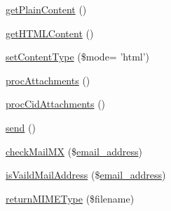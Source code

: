 \begin{DoxyCompactItemize}
\item 
\hyperlink{classMail_ac1a5a2b325a14e6331f13d2b2b18d9f8}{get\-Plain\-Content} ()
\item 
\hyperlink{classMail_a74db66148c78f2e732a3f2797b108eae}{get\-H\-T\-M\-L\-Content} ()
\item 
\hyperlink{classMail_adc8e047b6acd8b183bac7082180cb18f}{set\-Content\-Type} (\$mode= 'html')
\item 
\hyperlink{classMail_a136e94d3b4ae6cea8944cf05f58754ce}{proc\-Attachments} ()
\item 
\hyperlink{classMail_a185f66ac96139a53251ede273a120d13}{proc\-Cid\-Attachments} ()
\item 
\hyperlink{classMail_a6520941b529c223c1b59ec7544f7f7d6}{send} ()
\item 
\hyperlink{classMail_a0bdfc629861cf1048ac189d61fd57ef4}{check\-Mail\-M\-X} (\$\hyperlink{ko_8install_8php_a1dffea0d5ba8194f8ef01f414af0c831}{email\-\_\-address})
\item 
\hyperlink{classMail_a2d7fd899ae79dc18e7804a044127dbac}{is\-Vaild\-Mail\-Address} (\$\hyperlink{ko_8install_8php_a1dffea0d5ba8194f8ef01f414af0c831}{email\-\_\-address})
\item 
\hyperlink{classMail_afe036d54e43919318cb8e081533e7b90}{return\-M\-I\-M\-E\-Type} (\$filename)
\end{DoxyCompactItemize}
